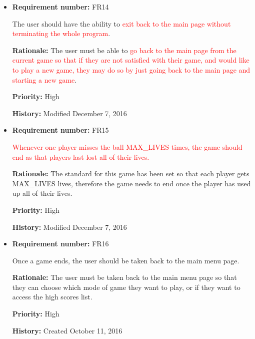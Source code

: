 \documentclass[12pt,letterpaper]{article}
\begin{document}
\begin{reqbox}
	\begin{itemize}
		\item \textbf{Requirement number: }FR14

		The user should have the ability to \textcolor{red}{exit back to the main page without terminating the whole program}.

		\textbf{Rationale: }The user must be able to \textcolor{red}{go back to the main page from the current game so that if they are not satisfied with their game, and would like to play a new game, they may do so by just going back to the main page and starting a new   game}.

		\textbf{Priority: }High

		\textbf{History: }Modified December 7, 2016
	\end{itemize}
\end{reqbox}

\begin{reqbox}
	\begin{itemize}
		\item \textbf{Requirement number: }FR15

		\textcolor{red}{Whenever one player misses the ball MAX_LIVES times, the game should end as that players last lost all of their lives.}

		\textbf{Rationale: }The standard for this game has been set so that each player gets MAX_LIVES lives, therefore the game needs to end once the player has used up all of their lives.

		\textbf{Priority: }High

		\textbf{History: }Modified December 7, 2016
	\end{itemize}
\end{reqbox}

\begin{reqbox}
	\begin{itemize}
		\item \textbf{Requirement number: }FR16
	
		Once a game ends, the user should be taken back to the main menu page.

		\textbf{Rationale: }The user must be taken back to the main menu page so that they can choose which mode of game they want to play, or if they want to access the high scores list.

		\textbf{Priority: }High

		\textbf{History: }Created October 11, 2016
	\end{itemize}
\end{reqbox}
\end{document}
